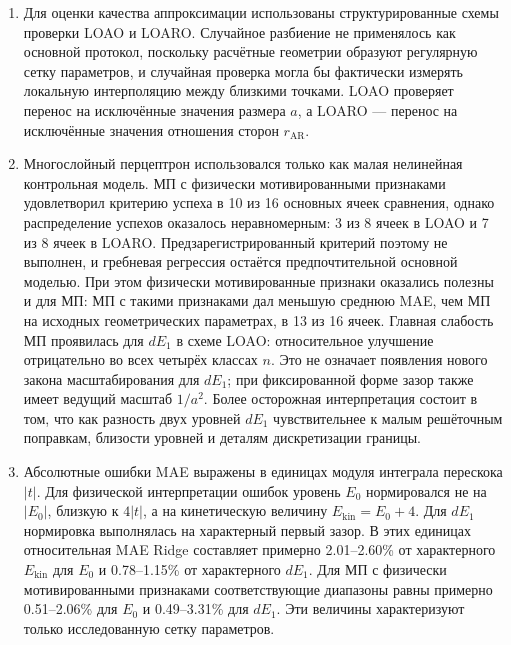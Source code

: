 \begin{enumerate}
  \item Для оценки качества аппроксимации использованы структурированные схемы проверки
  LOAO и LOARO. Случайное разбиение не применялось как основной протокол, поскольку
  расчётные геометрии образуют регулярную сетку параметров, и случайная проверка могла бы
  фактически измерять локальную интерполяцию между близкими точками. LOAO проверяет
  перенос на исключённые значения размера $a$, а LOARO --- перенос на исключённые значения
  отношения сторон $r_{\mathrm{AR}}$.

  \item Многослойный перцептрон использовался только как малая нелинейная контрольная
  модель. МП с физически мотивированными признаками удовлетворил критерию успеха в 10 из
  16 основных ячеек сравнения, однако распределение успехов оказалось неравномерным: 3 из
  8 ячеек в LOAO и 7 из 8 ячеек в LOARO. Предзарегистрированный критерий поэтому не
  выполнен, и гребневая регрессия остаётся предпочтительной основной моделью. При этом
  физически мотивированные признаки оказались полезны и для МП: МП с такими признаками дал
  меньшую среднюю MAE, чем МП на исходных геометрических параметрах, в 13 из 16 ячеек.
  Главная слабость МП проявилась для $dE_1$ в схеме LOAO: относительное улучшение
  отрицательно во всех четырёх классах $n$. Это не означает появления нового закона
  масштабирования для $dE_1$; при фиксированной форме зазор также имеет ведущий масштаб
  $1/a^2$. Более осторожная интерпретация состоит в том, что как разность двух уровней
  $dE_1$ чувствительнее к малым решёточным поправкам, близости уровней и деталям
  дискретизации границы.

  \item Абсолютные ошибки MAE выражены в единицах модуля интеграла перескока $|t|$. Для
  физической интерпретации ошибок уровень $E_0$ нормировался не на $|E_0|$, близкую к
  $4|t|$, а на кинетическую величину $E_{\mathrm{kin}}=E_0+4$. Для $dE_1$ нормировка
  выполнялась на характерный первый зазор. В этих единицах относительная MAE Ridge
  составляет примерно 2.01--2.60\% от характерного $E_{\mathrm{kin}}$ для $E_0$ и
  0.78--1.15\% от характерного $dE_1$. Для МП с физически мотивированными признаками
  соответствующие диапазоны равны примерно 0.51--2.06\% для $E_0$ и 0.49--3.31\% для
  $dE_1$. Эти величины характеризуют только исследованную сетку параметров.


\end{enumerate}
